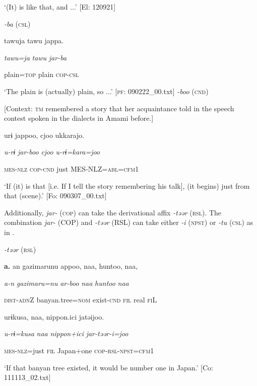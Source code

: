\glt ‘(It) is like that, and ...’ [El: 120921]

\ex \textit{{}-ba} (\textsc{csl})

    {\TM}
\glll  tawuja  tawu  jappa.

      \textit{tawu=ja}  \textit{tawu}  \textit{jar-ba}

      plain=\textsc{top}  plain  \textsc{cop}-\textsc{csl}

\glt ‘The plain is (actually) plain, so ...’ [\textsc{pf}: 090222\_00.txt]
\ex \textit{{}-boo} (\textsc{cnd})

    [Context: \textsc{tm} remembered a story that her acquaintance told in the speech contest spoken in the dialects in Amami before.]

    {\TM}
\glll  urɨ  jappoo,  cjoo  ukkarajo.

      \textit{u-rɨ}  \textit{jar-boo}  \textit{cjoo}  \textit{u-rɨ=kara=joo}

      \textsc{mes}-\textsc{nlz}  \textsc{cop}-\textsc{cnd}  just  MES-NLZ=\textsc{abl}=\textsc{cfm1}

\glt ‘If (it) is that [i.e. If I tell the story remembering his talk], (it begins) just from that (scene).’ [Fo: 090307\_00.txt]
\z

Additionally, \textit{jar-} (\textsc{cop}) can take the derivational affix \textit{{}-təər} (\textsc{rsl}). The combination \textit{jar-} (COP) and \textit{{}-təər} (RSL) can take either \textit{{}-i} (\textsc{npst}) or \textit{{}-tu} (\textsc{csl}) as in .

\textbf{\ea\label{ex:8-37}
}  \textit{{}-təər} (\textsc{rsl})

  \textbf{a.}  {\TM}
\glll  an  gazimarunu  appoo,  naa,  huntoo,  naa,

      \textit{a-n}  \textit{gazimaru=nu}  \textit{ar-boo}  \textit{naa}  \textit{huntoo}  \textit{naa}

      \textsc{dist}-\textsc{adn}Z  banyan.tree=\textsc{nom}  exist-\textsc{cnd}  \textsc{fil}  real  \textsc{fi}L

      urɨkusa,  naa,  {\textbar}nippon.ici{\textbar}  jatəijoo.

      \textit{u-rɨ=kusa}  \textit{naa}  \textit{nippon+ici}  \textit{jar-təər-i=joo}

      \textsc{mes}-\textsc{nlz}=just  \textsc{fil}  Japan+one  \textsc{cop}-\textsc{rsl}-\textsc{npst}=\textsc{cfm1}

\glt ‘If that banyan tree existed, it would be number one in Japan.’ [Co: 111113\_02.txt]
\z

